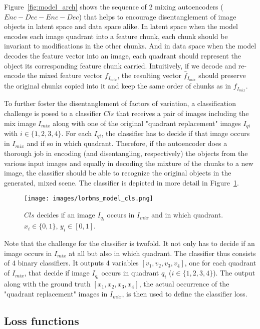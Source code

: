 \documentclass[12pt,a4paper]{article}
\begin{document}
Figure~\ref{fig:model_arch} shows the sequence of 2 mixing autoencoders ($Enc-Dec-Enc-Dec$) that helps to encourage disentanglement of image objects in latent space and data space alike. In latent space when the model encodes each image quadrant into a feature chunk, each chunk should be invariant to modifications in the other chunks. And in data space when the model decodes the feature vector into an image, each quadrant should represent the object its corresponding feature chunk carried. Intuitively, if we decode and re-encode the mixed feature vector $f_{I_{mix}}$, the resulting vector $\hat{f}_{I_{mix}}$ should preserve the original chunks copied into it and keep the same order of chunks as in $f_{I_{mix}}$.

To further foster the disentanglement of factors of variation, a classification challenge is posed to a classifier $Cls$ that receives a pair of images including the mix image $I_{mix}$ along with one of the original "quadrant replacement" images $I_{qi}$ with $i \in \{1,2,3,4\}$. For each $I_{qi}$, the classifier has to decide if that image occurs in $I_{mix}$ and if so in which quadrant. Therefore, if the autoencoder does a thorough job in encoding (and disentangling, respectively) the objects from the various input images and equally in decoding the mixture of the chunks to a new image, the classifier should be able to recognize the original objects in the generated, mixed scene. The classifier is depicted in more detail in Figure~\ref{fig:model_cls}.
\begin{figure}[ht]
\centering
\texttt{[image: images/lorbms\_model\_cls.png]}
\caption{$Cls$ decides if an image $I_{q_i}$ occurs in $I_{mix}$ and in which quadrant. $x_i \in \{0,1\}$, $y_i \in [0,1]$.}
\label{fig:model_cls}
\end{figure}
Note that the challenge for the classifier is twofold. It not only has to decide if an image occurs in $I_{mix}$ at all but also in which quadrant. The classifier thus consists of 4 binary classifiers. It outputs 4 variables $[v_1,v_2,v_3,v_4]$, one for each quadrant of $I_{mix}$, that decide if image $I_{q_i}$ occurs in quadrant $q_i$ ($i \in \{1,2,3,4\}$). The output along with the ground truth $[x_1,x_2,x_3,x_4]$, the actual occurrence of the "quadrant replacement" images in $I_{mix}$, is then used to define the classifier loss.

\subsection{Loss functions}
\end{document}
